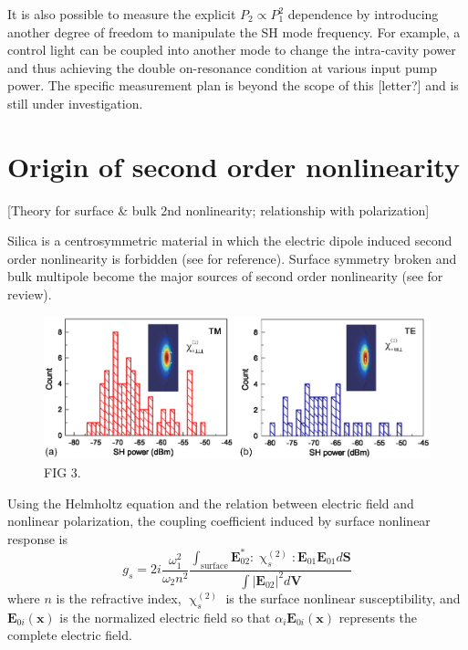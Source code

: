 \documentclass[a4paper,8pt,hyperref, twocolumn]{article}
\begin{document}
It is also possible to measure the explicit $P_2 \propto P_1^2$ dependence by introducing another degree of freedom to manipulate the SH mode frequency. For example, a control light can be coupled into another mode to change the intra-cavity power and thus achieving the double on-resonance condition at various input pump power. The specific measurement plan is beyond the scope of this [letter?] and is still under investigation.


\section{Origin of second order nonlinearity}
[Theory for surface \& bulk 2nd nonlinearity; relationship with polarization]

Silica is a centrosymmetric material in which the electric dipole induced second order nonlinearity is forbidden (see \cite{boyd2003nonlinear} for reference). Surface symmetry broken and bulk multipole become the major sources of second order nonlinearity (see \cite{heinz1991second} for review). 

\begin{figure}[!ht]
\includegraphics[width=18cm]{Fig3.eps}
\caption{FIG 3.}
\label{pic:Fig3}
\end{figure}



Using the Helmholtz equation and the relation between electric field and nonlinear polarization, the coupling coefficient induced by surface nonlinear response is
\begin{equation}
g_s = 2i\frac{\omega_1^2}{\omega_2n^2}\frac{\int_{\mathrm{surface} } \mathbf{E}_{02}^*:\upchi^{(2)}_s:\mathbf{E}_{01}\mathbf{E}_{01} d\mathbf{S}}{\int |\mathbf{E}_{02}|^2 d\mathbf{V}}
\end{equation}
where $n$ is the refractive index, $\upchi^{(2)}_s$ is the surface nonlinear susceptibility, and $\mathbf{E}_{0i}(\mathbf{x})$ is the  normalized electric field so that $\alpha_i\mathbf{E}_{0i}(\mathbf{x})$ represents the complete electric field. 
\end{document}
